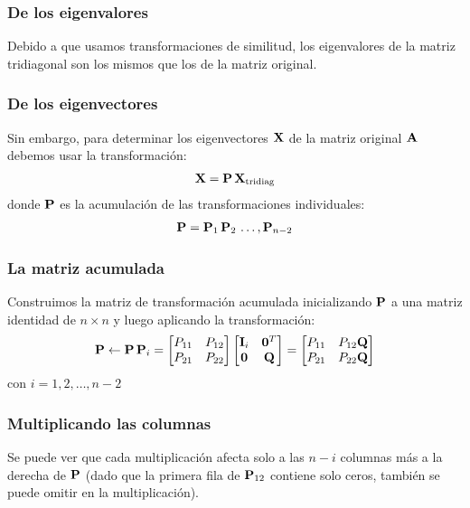 \documentclass[12pt]{beamer}
\begin{document}
\begin{frame}
\frametitle{De los eigenvalores}
Debido a que usamos transformaciones de similitud, los eigenvalores de la matriz tridiagonal son los mismos que los de la matriz original.
\end{frame}
\begin{frame}
\frametitle{De los eigenvectores}
Sin embargo, para determinar los eigenvectores $\vb{X}$ de la matriz original $\vb{A}$ debemos usar la transformación:
\pause
\begin{align*}
\vb{X} = \vb{P} \, \vb{X}_{\text{tridiag}}
\end{align*}
\pause
donde $\vb{P}$ es la acumulación de las transformaciones individuales:
\pause
\begin{align*}
\vb{P} = \vb{P}_{1} \, \vb{P}_{2} \, \ldots , \vb{P}_{n-2}
\end{align*}
\end{frame}
\begin{frame}
\frametitle{La matriz acumulada}
Construimos la matriz de transformación acumulada inicializando $\vb{P}$ a una matriz identidad de $n \times n$ y luego aplicando la transformación:
\pause
\renewcommand{\arraystretch}{1}
\begin{align}
\vb{P} \leftarrow \vb{P} \, \vb{P}_{i} =
\begin{bmatrix}
P_{11} & P_{12} \\
P_{21} & P_{22}
\end{bmatrix}
\begin{bmatrix}
\vb{I}_{i} & \vb{0}^{T} \\
\vb{0} & \vb{Q}
\end{bmatrix} =
\begin{bmatrix}
P_{11} & P_{12} \vb{Q} \\
P_{21} & P_{22} \vb{Q}
\end{bmatrix}
\label{eq:ecuacion_b}
\end{align}
con $i = 1, 2, \ldots, n - 2$
\end{frame}
\begin{frame}
\frametitle{Multiplicando las columnas}
Se puede ver que cada multiplicación afecta solo a las $n - i$ columnas más a la derecha de $\vb{P}$ (dado que la primera fila de $\vb{P}_{12}$ contiene solo ceros, también se puede omitir en la multiplicación).
\end{frame}
\end{document}
